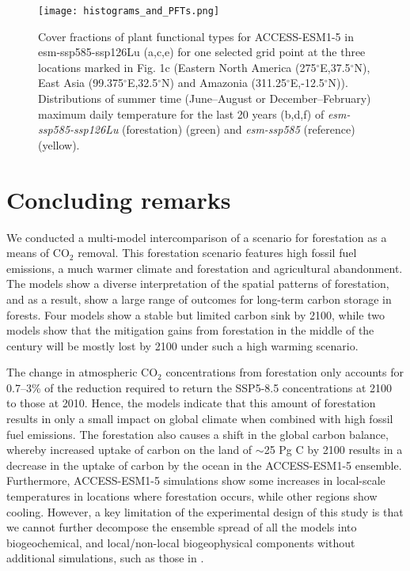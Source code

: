 \documentclass[draft]{agujournal2019}
\begin{document}
\begin{figure}
    \texttt{[image: histograms\_and\_PFTs.png]}
    \caption{Cover fractions of plant functional types for ACCESS-ESM1-5 in esm-ssp585-ssp126Lu (a,c,e) for one selected grid point at the three locations marked in Fig. 1c (Eastern North America (275$^\circ$E,37.5$^\circ$N), East Asia (99.375$^\circ$E,32.5$^\circ$N) and Amazonia (311.25$^\circ$E,-12.5$^\circ$N)). Distributions of summer time (June--August or December--February) maximum daily temperature for the last 20 years (b,d,f) of \textit{esm-ssp585-ssp126Lu} (forestation) (green) and \textit{esm-ssp585} (reference) (yellow).}
    \label{fig:tasmax_distribution}
\end{figure}

\section{Concluding remarks}

We conducted a multi-model intercomparison of a scenario for forestation as a means of CO$_2$ removal.
This forestation scenario features high fossil fuel emissions, a much warmer climate and forestation and agricultural abandonment.
The models show a diverse interpretation of the spatial patterns of forestation, and as a result, show a large range of outcomes for long-term carbon storage in forests.
Four models show a stable but limited carbon sink by 2100, while two models show that the mitigation gains from forestation in the middle of the century will be mostly lost by 2100 under such a high warming scenario.

The change in atmospheric CO$_2$ concentrations from forestation only accounts for 0.7--3\% of the reduction required to return the SSP5-8.5 concentrations at 2100 to those at 2010.
Hence, the models indicate that this amount of forestation results in only a small impact on global climate when combined with high fossil fuel emissions.
The forestation also causes a shift in the global carbon balance, whereby increased uptake of carbon on the land of $\sim$25 Pg C by 2100 results in a decrease in the uptake of carbon by the ocean in the ACCESS-ESM1-5 ensemble.
Furthermore, ACCESS-ESM1-5 simulations show some increases in local-scale temperatures in locations where forestation occurs, while other regions show cooling.
However, a key limitation of the experimental design of this study is that we cannot further decompose the ensemble spread of all the models into biogeochemical, and local/non-local biogeophysical components without additional simulations, such as those in .
\end{document}
